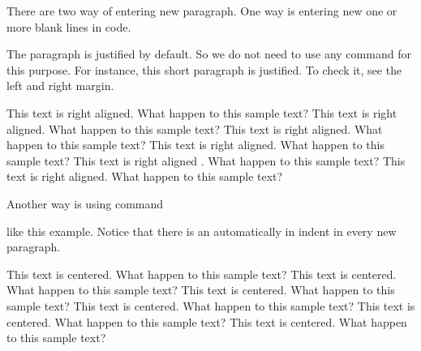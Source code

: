 \documentclass[a5paper, 10pt]{book}
\begin{document}
	There are two way of entering new paragraph. One way is entering new one
		or more blank lines in code. 
		\begin{flushleft}
			The paragraph is justified by default. So we do not need to use any
			command for this purpose. For instance, this short paragraph is
			justified. To check it, see the left and right margin.
		\end{flushleft}
		\begin{flushright}
	 	This text is right aligned. What happen to this sample text? This text
		is right aligned. What happen to this sample text? This text is
		right aligned. What happen to this sample text? This text is right
		aligned. What happen to this sample text? This text is right aligned
		. What happen to this sample text? This text is right aligned. What
		happen to this sample text?
		\end{flushright}
		\newpage
	Another way is using command \par like this example. Notice that there is
		an automatically in indent in every new paragraph.
		\begin{center}
			 This text is centered. What happen to this sample text? This text is
			centered. What happen to this sample text? This text is centered.
			What happen to this sample text? This text is centered. What happen
			to this sample text? This text is centered. What happen to this
			sample text? This text is centered. What happen to this sample text?
		\end{center}
\end{document}
